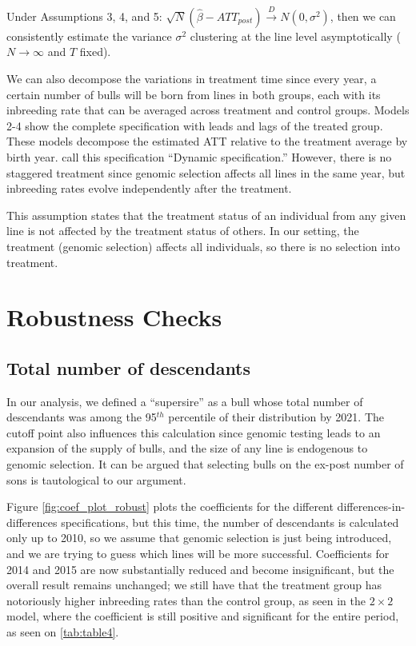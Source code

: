 \documentclass[12pt,letterpaper]{article}
\begin{document}
Under Assumptions 3, 4, and 5: $\sqrt{N}(\hat{\beta}-ATT_{post})\overset{D}{\rightarrow} N(0, \sigma^{2})$, then we can consistently estimate the variance $\sigma^{2}$ clustering at the line level \citep{Bertrand2004} asymptotically ($N\rightarrow\infty$ and $T$ fixed).

We can also decompose the variations in treatment time since every year, a certain number of bulls will be born from lines in both groups, each with its inbreeding rate that can be averaged across treatment and control groups. Models 2-4 show the complete specification with leads and lags of the treated group. These models decompose the estimated ATT relative to the treatment average by birth year. \cite{Sun2021} call this specification ``Dynamic specification.'' However, there is no staggered treatment since genomic selection affects all lines in the same year, but inbreeding rates evolve independently after the treatment. 

This assumption states that the treatment status of an individual from any given line is not affected by the treatment status of others. In our setting, the treatment (genomic selection) affects all individuals, so there is no selection into treatment.
\section{Robustness Checks\label{subsec:robustness}}
\subsection{Total number of descendants\label{suvsubsec:progeny}}

In our analysis, we defined a ``supersire'' as a bull whose total number of descendants was among the 95$^{th}$ percentile of their distribution by 2021. The cutoff point also influences this calculation since genomic testing leads to an expansion of the supply of bulls, and the size of any line is endogenous to genomic selection. It can be argued that selecting bulls on the ex-post number of sons is tautological to our argument.

Figure \ref{fig:coef_plot_robust} plots the coefficients for the different differences-in-differences specifications, but this time, the number of descendants is calculated only up to 2010, so we assume that genomic selection is just being introduced, and we are trying to guess which lines will be more successful. Coefficients for 2014 and 2015 are now substantially reduced and become insignificant, but the overall result remains unchanged; we still have that the treatment group has notoriously higher inbreeding rates than the control group, as seen in the $2\times 2$ model, where the coefficient is still positive and significant for the entire period, as seen on \ref{tab:table4}.
\end{document}
